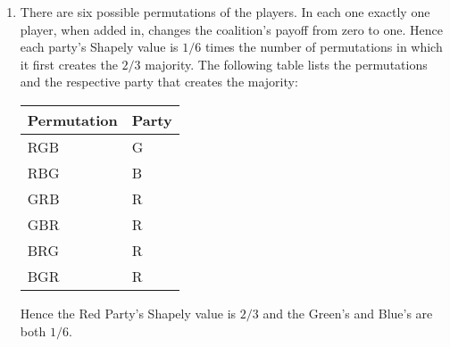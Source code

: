 \documentclass[11pt]{article} \usepackage{amssymb}
\begin{document}
\begin{enumerate}
\begin{enumerate}
\begin{enumerate}
    \item
      There are six possible permutations of the players. In each one
      exactly one player, when added in, changes the coalition's
      payoff from zero to one. Hence each party's Shapely value is
      $1/6$ times the number of permutations in which it first creates
      the $2/3$ majority. The following table lists the permutations
      and the respective party that creates the majority:
      \begin{table}
        \centering
        \begin{tabular}{l|l}
          Permutation & Party\\
          \hline
          RGB & G \\
          RBG & B \\
          GRB & R \\
          GBR & R \\
          BRG & R \\
          BGR & R
        \end{tabular}
      \end{table}
      Hence the Red Party's Shapely value is $2/3$ and the Green's and
      Blue's are both $1/6$.
    \end{enumerate}
    
  \end{enumerate}
\end{enumerate}
\end{document}
